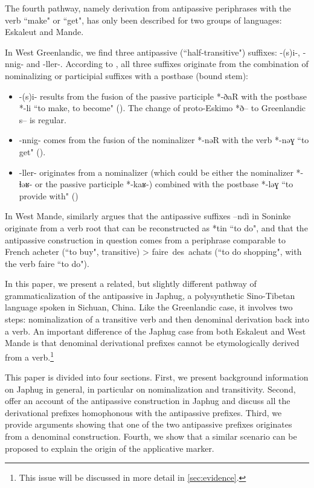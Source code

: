 \documentclass[oldfontcommands,oneside,a4paper,11pt]{article}
\newcommand{\ipa}[1]{{\phon \mbox{#1}}} %
\begin{document}
The fourth pathway, namely derivation from antipassive periphrases with the verb ``make" or ``get", has  only been described for two groups of languages: Eskaleut and Mande. 

In West Greenlandic, we find three antipassive (``half-transitive") suffixes: \ipa{-(s)i-}, \ipa{-nnig-} and \ipa{-ller-}. According to \citet{fortescue96halftrans}, all three suffixes originate from the combination of  nominalizing or   participial suffixes with a postbase (bound stem):

\begin{itemize}
\item  \ipa{-(s)i-} results from the fusion of the passive participle *-ðaR with the  postbase *-li ``to make, to become" (\citealt[438, 447]{fortescue10dico}). The change of proto-Eskimo *ð-- to Greenlandic s-- is regular.
\item \ipa{-nnig-} comes from the fusion of the nominalizer *-nəR with the verb *-nəɣ ``to get" (\citealt[457, 459]{fortescue10dico}).
\item  \ipa{-ller-} originates from a nominalizer (which could be either the nominalizer *-ɬəʁ- or the passive participle *-kaʁ-) combined with the postbase *-ləɣ ``to provide with" (\citet[451, 442, 459]{fortescue10dico}) 
\end{itemize}

In West Mande, \citet{creissels12antip}  similarly argues that the antipassive suffixes \ipa{--ndì} in Soninke  originate from a verb root that can be reconstructed as *tin ``to do", and that the antipassive construction in question comes from  a periphrase comparable to French \ipa{acheter} (``to buy", transitive) > \ipa{faire des achats} (``to do shopping", with the verb \ipa{faire} ``to do").
 	
 	
In this paper, we present a related, but slightly different pathway of grammaticalization of the antipassive in Japhug, a polysynthetic Sino-Tibetan language spoken in Sichuan, China. Like the Greenlandic case, it involves two steps: nominalization of a transitive verb and then denominal derivation back into a verb. An important difference of the Japhug case from both Eskaleut and West Mande is that denominal derivational prefixes cannot be etymologically derived from a verb.\footnote{This issue will be discussed in more detail in \ref{sec:evidence}.}


This paper is divided into four sections. First, we present background information on Japhug in general, in particular on nominalization and transitivity. Second, offer an account of the antipassive construction in Japhug and discuss all the derivational prefixes homophonous with the antipassive prefixes. Third, we provide arguments showing that one of the two antipassive prefixes originates from a denominal construction. Fourth, we show that a similar scenario can be proposed to explain the origin of the applicative marker.
 
\end{document}
